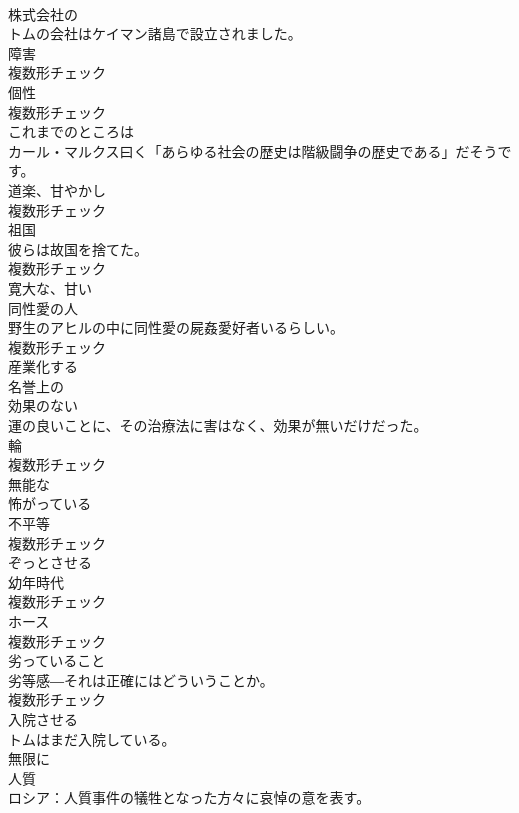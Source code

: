 \documentclass[8pt]{extreport}
\begin{document}
\begin{CJK}{UTF8}{min}
\\	[形容詞]	株式会社の	
\\	トムの会社はケイマン諸島で設立されました。	
\\	[名詞]	障害	
\\	複数形チェック
\\	[名詞]	個性	
\\	複数形チェック
\\	[副詞]	これまでのところは	
\\	カール・マルクス曰く「あらゆる社会の歴史は階級闘争の歴史である」だそうです。	
\\	[名詞]	道楽、甘やかし	
\\	複数形チェック
\\	[名詞]	祖国	
\\	彼らは故国を捨てた。	
\\	複数形チェック
\\	[形容詞]	寛大な、甘い	
\\	[名詞]	同性愛の人	
\\	野生のアヒルの中に同性愛の屍姦愛好者いるらしい。	
\\	複数形チェック
\\	[動詞]	産業化する	
\\	[形容詞]	名誉上の	
\\	[形容詞]	効果のない	
\\	運の良いことに、その治療法に害はなく、効果が無いだけだった。	
\\	[名詞]	輪	
\\	複数形チェック
\\	[形容詞]	無能な	
\\	[形容詞]	怖がっている	
\\	[名詞]	不平等	
\\	複数形チェック
\\	[動詞]	ぞっとさせる	
\\	[名詞]	幼年時代	
\\	複数形チェック
\\	[名詞]	ホース	
\\	複数形チェック
\\	[名詞]	劣っていること	
\\	劣等感―それは正確にはどういうことか。	
\\	複数形チェック
\\	[動詞]	入院させる	
\\	トムはまだ入院している。	
\\	[副詞]	無限に	
\\	[名詞]	人質	
\\	ロシア：人質事件の犠牲となった方々に哀悼の意を表す。	

\end{CJK}
\end{document}
